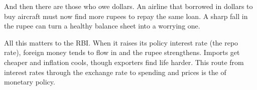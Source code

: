 And then there are those who owe dollars. An airline that borrowed in dollars to buy aircraft must now find more rupees to repay the same loan. A sharp fall in the rupee can turn a healthy balance sheet into a worrying one.

All this matters to the RBI. When it raises its policy interest rate (the repo rate), foreign money tends to flow in and the rupee strengthens. Imports get cheaper and inflation cools, though exporters find life harder. This route from interest rates through the exchange rate to spending and prices is the  of monetary policy.\cite{jayadev2021}
